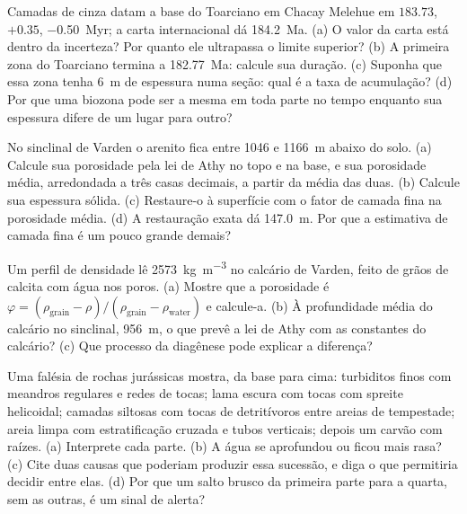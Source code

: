 \begin{exercise}[$\star\star$]\label{exo:b2:palaeoenvironments:6}
Camadas de cinza datam a base do Toarciano em Chacay Melehue em $183.73$, $+0.35$, \qty{-0.50}{Myr};
a carta internacional dá \qty{184.2}{Ma}. (a) O valor da carta está dentro da incerteza?
Por quanto ele ultrapassa o limite superior? (b) A primeira zona do Toarciano termina a
\qty{182.77}{Ma}: calcule sua duração. (c) Suponha que essa zona tenha \qty{6}{m} de espessura numa seção:
qual é a taxa de acumulação? (d) Por que uma biozona pode ser a mesma em toda parte no tempo enquanto sua
espessura difere de um lugar para outro?
\end{exercise}

\begin{exercise}[$\star\star$]\label{exo:b2:palaeoenvironments:7}
No sinclinal de Varden o arenito fica entre 1046 e \qty{1166}{m} abaixo do solo. (a)
Calcule sua porosidade pela lei de Athy no topo e na base, e sua porosidade média, arredondada a
três casas decimais, a partir da média das duas. (b) Calcule sua espessura sólida. (c) Restaure-o à
superfície com o fator de camada fina na porosidade média. (d) A restauração exata dá
\qty{147.0}{m}. Por que a estimativa de camada fina é um pouco grande demais?
\end{exercise}

\begin{exercise}[$\star\star$]\label{exo:b2:palaeoenvironments:8}
Um perfil de densidade lê \qty{2573}{kg.m^{-3}} no calcário de Varden, feito de grãos de calcita com
água nos poros. (a) Mostre que a porosidade é $\varphi = (\rho_{\text{grain}} -
\rho)/(\rho_{\text{grain}} - \rho_{\text{water}})$ e calcule-a. (b) À profundidade média do
calcário no sinclinal, \qty{956}{m}, o que prevê a lei de Athy com as constantes do calcário?
(c) Que processo da diagênese pode explicar a diferença?
\end{exercise}

\begin{exercise}[$\star\star$]\label{exo:b2:palaeoenvironments:9}
Uma falésia de rochas jurássicas mostra, da base para cima: turbiditos finos com meandros regulares e redes de
tocas; lama escura com tocas com spreite helicoidal; camadas siltosas com tocas de detritívoros entre
areias de tempestade; areia limpa com estratificação cruzada e
tubos verticais; depois um carvão com raízes. (a) Interprete cada parte. (b) A água se aprofundou ou ficou
mais rasa? (c) Cite duas causas que poderiam produzir essa sucessão, e diga o que permitiria decidir
entre elas. (d) Por que um salto brusco da primeira parte para a quarta, sem as outras, é um
sinal de alerta?
\end{exercise}

